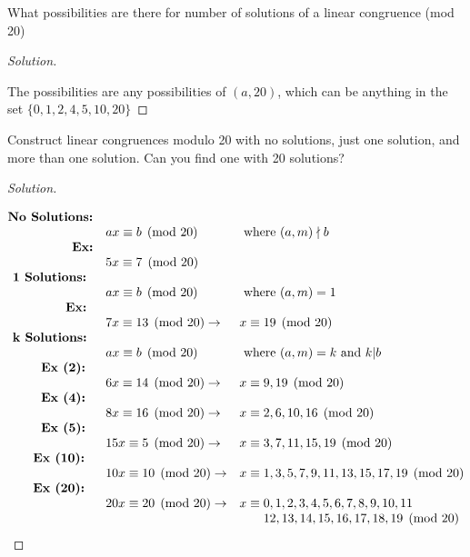 \documentclass[11pt]{article}
\newcommand{\ndiv}{\nmid}
\newenvironment{problem}[2][Problem]{\begin{trivlist}
\item[\hskip \labelsep {\bfseries #1}\hskip \labelsep {\bfseries #2.}]}{\end{trivlist}}
\newenvironment{solution}
  {\renewcommand\qedsymbol{$~$}\begin{proof}[Solution]$ $\par\nobreak\ignorespaces}
  {\end{proof}}
\begin{document}
\begin{problem}{5}
What possibilities are there for number of solutions of a linear congruence (mod 20)
\end{problem}

\begin{solution}
    The possibilities are any possibilities of $(a,20)$, which can be anything in the set $\{0,1,2,4,5,10,20\}$
\end{solution}


\begin{problem}{6}
Construct linear congruences modulo 20 with no solutions, just one solution, and more than one solution. Can you find one with 20 solutions?
\end{problem}

\begin{solution}
    \[
        \begin{matrix*}[l]
            \text{\textbf{No Solutions:}} &                  \\
            & ax \equiv b \pmod{20} &\text{ where } (a,m)\ndiv b \\
            \text{\textbf{\phantom{No Solutii}Ex:}} &                  \\
            & 5x \equiv 7 \pmod{20} \\
            \text{\textbf{  1 Solutions:}} &                  \\
            & ax \equiv b \pmod{20} &\text{ where } (a,m)=1 \\
            \text{\textbf{\phantom{  1 Solutii}Ex:}} &                  \\
            & 7x \equiv 13 \pmod{20} \rightarrow & x\equiv 19 \pmod{20} \\
            \text{\textbf{  k Solutions:}} &                  \\
            & ax \equiv b \pmod{20} &\text{ where } (a,m)=k \text{ and } k|b \\
            \text{\textbf{\phantom{  k Sii}Ex (2):}} &                  \\
            & 6x \equiv 14 \pmod{20} \rightarrow & x\equiv 9, 19 \pmod{20} \\
            \text{\textbf{\phantom{  k Sii}Ex (4):}} &                  \\
            & 8x \equiv 16 \pmod{20} \rightarrow&  x\equiv 2, 6, 10, 16 \pmod{20} \\
            \text{\textbf{\phantom{  k Sii}Ex (5):}} &                  \\
            & 15x \equiv 5 \pmod{20} \rightarrow & x\equiv 3, 7, 11, 15, 19 \pmod{20} \\
            \text{\textbf{\phantom{  k S}Ex (10):}} &                  \\
            & 10x \equiv 10 \pmod{20} \rightarrow & x\equiv 1, 3, 5, 7,9,11,13,15,17,19\pmod{20} \\
            \text{\textbf{\phantom{  k S}Ex (20):}} &                  \\
            & 20x \equiv 20 \pmod{20} \rightarrow & x\equiv 0,1,2,3,4,5,6,7,8,9,10,11\\
            && \phantom{x\equiv' } 12,13,14,15,16,17,18,19 \pmod{20} \\


\end{matrix*}\]
\end{solution}
\end{document}
